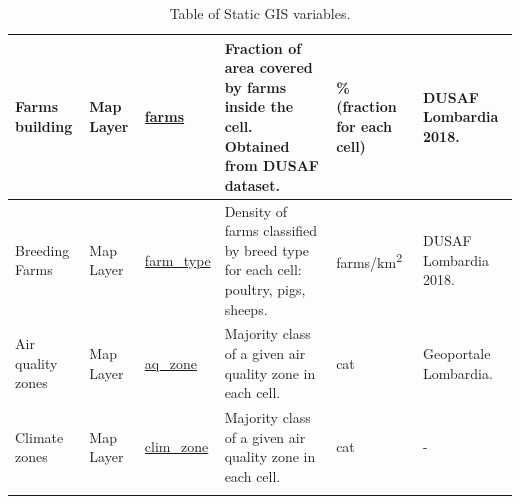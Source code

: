 \begin{center}
\begin{longtable}{ |p{2.3cm}|p{1.5cm}|p{2.3cm}|p{4cm}|p{1.5cm}|p{2.3cm}| }
\multirow{1}{4em}{Farms building} & Map Layer  & \underline{farms} & Fraction of area covered by farms inside the cell. Obtained from DUSAF dataset. & \% (fraction for each cell) & DUSAF Lombardia 2018.\\ \hline
\multirow{1}{4em}{Breeding Farms} & Map Layer  & \underline{farm\_type} & Density of farms classified by breed type for each cell: poultry, pigs, sheeps. & farms/km\textsuperscript{2} & DUSAF Lombardia 2018.\\ \hline
\multirow{1}{4em}{Air quality zones} & Map Layer  & \underline{aq\_zone} & Majority class of a given air quality zone in each cell. & cat  & Geoportale Lombardia.\\ \hline
\multirow{1}{4em}{Climate zones} & Map Layer  & \underline{clim\_zone} & Majority class of a given air quality zone in each cell. & cat  & - \\ \hline


\hline
\caption{Table of Static GIS variables.}

\end{longtable}
\end{center}
\pagebreak

